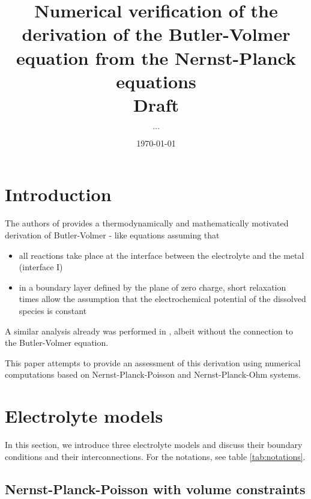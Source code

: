 \documentclass[12pt,oneside,reqno]{amsart}
\title[Verification of Butler-Volmer derivation]{Numerical verification of the derivation of the Butler-Volmer equation from
the Nernst-Planck equations\\ Draft}
\author{$\dots$}
\date{\today}
\numberwithin{equation}{section}
\begin{document}
\maketitle

\section{Introduction}

The authors of \cite{dreyer2016new} provides a thermodynamically and  mathematically motivated  derivation of
Butler-Volmer - like  equations assuming that 
\begin{itemize}
\item all reactions take place at the interface between the electrolyte
and the metal (interface I)
\item in a boundary layer defined by the plane of zero charge, short relaxation
  times allow the assumption that the electrochemical potential of the dissolved species
  is constant
\end{itemize}
A similar analysis already was performed in \cite{rubinstein1990electro}, albeit without the
connection to the Butler-Volmer equation.

This paper attempts to provide  an assessment of this derivation using
numerical    computations   based    on   Nernst-Planck-Poisson    and
Nernst-Planck-Ohm systems.

\section{Electrolyte models}

In this  section, we  introduce three  electrolyte models  and discuss
their boundary conditions and their interconnections. For the notations,
see table \ref{tab:notations}.

\subsection{Nernst-Planck-Poisson  with  volume constraints} 
\end{document}
